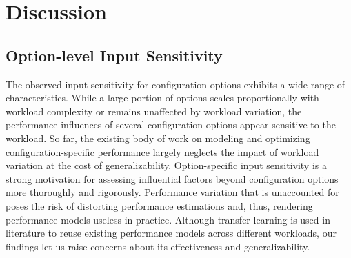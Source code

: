 \section{Discussion}

\subsection{Option-level Input Sensitivity}

The observed input sensitivity for configuration options exhibits a wide range of characteristics. While a large portion of options scales proportionally with workload complexity or remains unaffected by workload variation, the performance influences of several configuration options appear sensitive to the workload.  So far, the existing body of work on modeling and optimizing configuration-specific performance largely neglects the impact of workload variation at the cost of generalizability. Option-specific input sensitivity is a strong motivation for assessing influential factors beyond configuration options more thoroughly and rigorously. Performance variation that is unaccounted for poses the risk of distorting performance estimations and, thus, rendering performance models useless in practice. Although transfer learning is used in literature to reuse existing performance models across different workloads, our findings let us raise concerns about its effectiveness and generalizability. 

